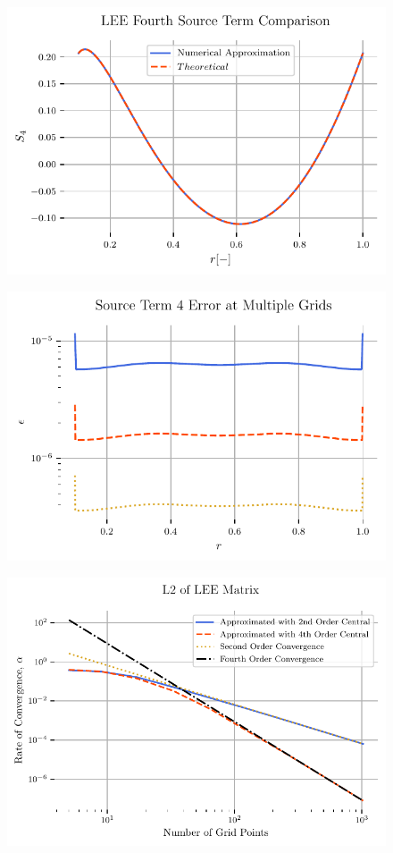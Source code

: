\documentclass{article}
\begin{document}
\begin{figure}
    \centering
    \includegraphics[width=\textwidth]{tex-outputs/SourceTermComparison4.pdf}
\end{figure}

\begin{figure}
    \centering
    \includegraphics[width=\textwidth]{tex-outputs/SourceTermError4.pdf}
\end{figure}

\begin{figure}
    \centering
    \includegraphics[width=\textwidth]{tex-outputs/MMS1_LEE_L2.pdf}
\end{figure}
\end{document}
